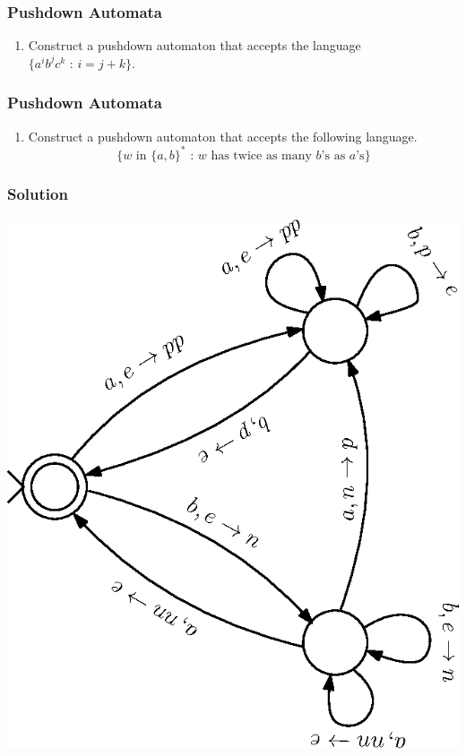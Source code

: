 \documentclass[11.5pt]{beamer}
\begin{document}
\begin{frame}[t]
	\frametitle{Pushdown Automata}
	\begin{enumerate}[(2)]
		\item Construct a pushdown automaton that accepts the language $\{\text{$a^ib^jc^k$ : $i = j + k$}\}$.
		
		\vspace{2em}
	\end{enumerate}
\end{frame}

\begin{frame}[t]
	\frametitle{Pushdown Automata}
	\begin{enumerate}[(3)]
		\item Construct a pushdown automaton that accepts the following language.
		\begin{displaymath}
			\{\text{$w$ in $\{a, b\}^*$ : $w$ has twice as many $b$'s as $a$'s}\}
		\end{displaymath}
	\end{enumerate}
\end{frame}

\begin{frame}[t]
	\frametitle{Solution}
	\begin{center}
		\includegraphics[scale = 0.6]{q3.eps}
	\end{center}
\end{frame}
\end{document}
